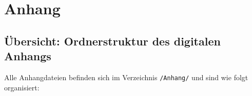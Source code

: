 \newpage
{}
\section*{Anhang}


\subsection*{Übersicht: Ordnerstruktur des digitalen Anhangs}

Alle Anhangdateien befinden sich im Verzeichnis \texttt{/Anhang/} und sind wie folgt organisiert:

